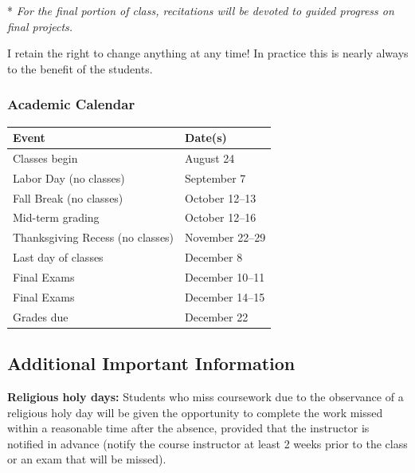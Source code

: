 \documentclass[
  letterpaper,
  DIV=11,
  numbers=noendperiod]{scrartcl}
\newcounter{none} %
\begin{document}
* \emph{For the final portion of class, recitations will be devoted to
guided progress on final projects.}

\begin{tcolorbox}[enhanced jigsaw, arc=.35mm, bottomrule=.15mm, bottomtitle=1mm, breakable, colback=white, colbacktitle=quarto-callout-important-color!10!white, colframe=quarto-callout-important-color-frame, coltitle=black, left=2mm, leftrule=.75mm, opacityback=0, opacitybacktitle=0.6, rightrule=.15mm, title=\textcolor{quarto-callout-important-color}{\faExclamation}\hspace{0.5em}{Important}, titlerule=0mm, toprule=.15mm, toptitle=1mm]

I retain the right to change anything at any time! In practice this is
nearly always to the benefit of the students.

\end{tcolorbox}

\subsubsection{Academic Calendar}\label{academic-calendar}

{\def\LTcaptype{none} %
\begin{longtable}[]{@{}ll@{}}
\toprule\noalign{}
Event & Date(s) \\
\midrule\noalign{}
\endhead
\bottomrule\noalign{}
\endlastfoot
Classes begin & August 24 \\
Labor Day (no classes) & September 7 \\
Fall Break (no classes) & October 12--13 \\
Mid-term grading & October 12--16 \\
Thanksgiving Recess (no classes) & November 22--29 \\
Last day of classes & December 8 \\
Final Exams & December 10--11 \\
Final Exams & December 14--15 \\
Grades due & December 22 \\
\end{longtable}
}

\subsection{Additional Important
Information}\label{additional-important-information}

\textbf{Religious holy days:} Students who miss coursework due to the
observance of a religious holy day will be given the opportunity to
complete the work missed within a reasonable time after the absence,
provided that the instructor is notified in advance (notify the course
instructor at least 2 weeks prior to the class or an exam that will be
missed).
\end{document}
